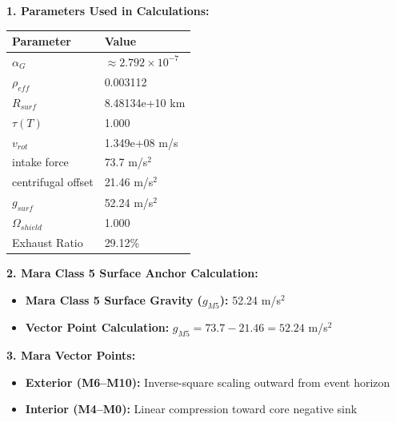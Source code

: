 \documentclass[11pt, a4paper]{article}
\begin{document}
\vspace{0.5em}
\noindent \textbf{1. Parameters Used in Calculations:}
\begin{center}
  \begin{tabular}{|l|l|}
    \hline
    \textbf{Parameter} & \textbf{Value} \\ \hline
    $\alpha_G$ & $\approx 2.792 \times 10^{-7}$ \\ \hline
    $\rho_{eff}$ & 0.003112 \\ \hline
    $R_{surf}$ & 8.48134e+10 km \\ \hline
    $\tau(T)$ & 1.000 \\ \hline
    $v_{rot}$ & 1.349e+08 m/s \\ \hline
    intake force & 73.7 m/s$^2$ \\ \hline
    centrifugal offset & 21.46 m/s$^2$ \\ \hline
    $g_{surf}$ & 52.24 m/s$^2$ \\ \hline
    $\Omega_{shield}$ & 1.000 \\ \hline
    Exhaust Ratio & 29.12\% \\ \hline
  \end{tabular}
\end{center}

\vspace{0.5em}
\noindent \textbf{2. Mara Class 5 Surface Anchor Calculation:}
\begin{itemize}
  \item \textbf{Mara Class 5 Surface Gravity ($g_{M5}$):} 52.24 m/s$^2$
  \item \textbf{Vector Point Calculation:} $g_{M5} = 73.7 - 21.46 = 52.24$ m/s$^2$
\end{itemize}

\vspace{0.5em}
\noindent \textbf{3. Mara Vector Points:}
\begin{itemize}
  \item \textbf{Exterior (M6--M10):} Inverse-square scaling outward from event horizon
  \item \textbf{Interior (M4--M0):} Linear compression toward core negative sink
\end{itemize}
\end{document}
